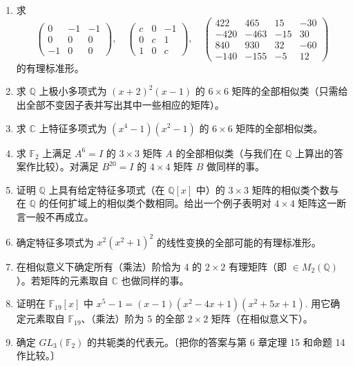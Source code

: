 \begin{enumerate}
\item 求
\[
\begin{pmatrix} 0 & -1 & -1 \\ 0 & 0 & 0 \\ -1 & 0 & 0 \end{pmatrix}, \quad \begin{pmatrix} c & 0 & -1 \\ 0 & c & 1 \\ 1 & 0 & c \end{pmatrix}, \quad \begin{pmatrix} 422 & 465 & 15 & -30 \\ -420 & -463 & -15 & 30 \\ 840 & 930 & 32 & -60 \\ -140 & -155 & -5 & 12 \end{pmatrix}
\]
的有理标准形。

\item 求 \(\mathbb{Q}\) 上极小多项式为 \((x+2)^2(x-1)\) 的 \(6 \times 6\) 矩阵的全部相似类（只需给出全部不变因子表并写出其中一些相应的矩阵）。

\item 求 \(\mathbb{C}\) 上特征多项式为 \((x^4-1)(x^2-1)\) 的 \(6 \times 6\) 矩阵的全部相似类。

\item 求 \(\mathbb{F}_2\) 上满足 \(A^6 = I\) 的 \(3 \times 3\) 矩阵 \(A\) 的全部相似类（与我们在 \(\mathbb{Q}\) 上算出的答案作比较）。对满足 \(B^{20} = I\) 的 \(4 \times 4\) 矩阵 \(B\) 做同样的事。

\item 证明 \(\mathbb{Q}\) 上具有给定特征多项式（在 \(\mathbb{Q}[x]\) 中）的 \(3 \times 3\) 矩阵的相似类个数与在 \(\mathbb{Q}\) 的任何扩域上的相似类个数相同。给出一个例子表明对 \(4 \times 4\) 矩阵这一断言一般不再成立。

\item 确定特征多项式为 \(x^2(x^2+1)^2\) 的线性变换的全部可能的有理标准形。

\item 在相似意义下确定所有（乘法）阶恰为 4 的 \(2 \times 2\) 有理矩阵（即 \(\in M_2(\mathbb{Q})\)）。若矩阵的元素取自 \(\mathbb{C}\) 也做同样的事。

\item 证明在 \(\mathbb{F}_{19}[x]\) 中 \(x^5-1 = (x-1)(x^2-4x+1)(x^2+5x+1)\). 用它确定元素取自 \(\mathbb{F}_{19}\)、（乘法）阶为 5 的全部 \(2 \times 2\) 矩阵（在相似意义下）。

\item 确定 \(GL_3(\mathbb{F}_2)\) 的共轭类的代表元。〔把你的答案与第 6 章定理 15 和命题 14 作比较。〕


\end{enumerate}
